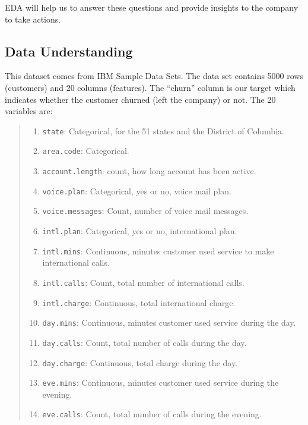 \documentclass[
]{book}
\newcommand{\passthrough}[1]{#1}
\providecommand{\tightlist}{%
  \setlength{\itemsep}{0pt}\setlength{\parskip}{0pt}}
\theoremstyle{definition}
\theoremstyle{definition}
\theoremstyle{definition}
\theoremstyle{definition}
\theoremstyle{remark}
\begin{document}
EDA will help us to answer these questions and provide insights to the company to take actions.

\subsection{Data Understanding}\label{data-understanding}

This dataset comes from IBM Sample Data Sets. The data set contains 5000 rows (customers) and 20 columns (features). The ``churn'' column is our target which indicates whether the customer churned (left the company) or not.
The 20 variables are:

\begin{quote}
\begin{enumerate}
\def\labelenumi{\arabic{enumi}.}
\tightlist
\item
  \passthrough{\lstinline!state!}: Categorical, for the 51 states and the District of Columbia.
\item
  \passthrough{\lstinline!area.code!}: Categorical.
\item
  \passthrough{\lstinline!account.length!}: count, how long account has been active.
\item
  \passthrough{\lstinline!voice.plan!}: Categorical, yes or no, voice mail plan.
\item
  \passthrough{\lstinline!voice.messages!}: Count, number of voice mail messages.
\item
  \passthrough{\lstinline!intl.plan!}: Categorical, yes or no, international plan.
\item
  \passthrough{\lstinline!intl.mins!}: Continuous, minutes customer used service to make international calls.
\item
  \passthrough{\lstinline!intl.calls!}: Count, total number of international calls.
\item
  \passthrough{\lstinline!intl.charge!}: Continuous, total international charge.
\item
  \passthrough{\lstinline!day.mins!}: Continuous, minutes customer used service during the day.
\item
  \passthrough{\lstinline!day.calls!}: Count, total number of calls during the day.
\item
  \passthrough{\lstinline!day.charge!}: Continuous, total charge during the day.
\item
  \passthrough{\lstinline!eve.mins!}: Continuous, minutes customer used service during the evening.
\item
  \passthrough{\lstinline!eve.calls!}: Count, total number of calls during the evening.

\end{enumerate}
\end{quote}
\end{document}

